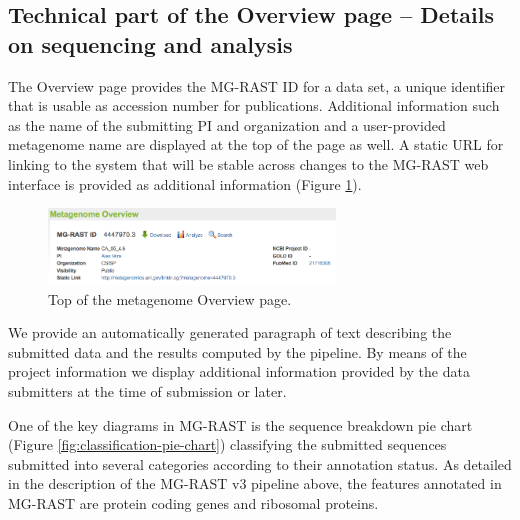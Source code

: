 \documentclass[12pt,fullpage]{report}
\begin{document}

\subsection{Technical part of the Overview page -- Details on sequencing and analysis}

The Overview page provides the MG-RAST ID for a data set, a unique identifier that is usable as accession number for publications. Additional information such as the name of the submitting PI and organization and a user-provided metagenome name are displayed at the top of the page as well. A static URL for linking to the system that will be stable across changes to the MG-RAST web interface is provided as additional information
(Figure \ref{fig:metagenome-overview}).

\begin{figure}
\begin{center}
\includegraphics[width=3in]{Images/metagenome-overview.png}
\end{center}
\caption{
Top of the metagenome Overview page.
}
\label{fig:metagenome-overview}
\end{figure}

We provide an automatically generated paragraph of text describing the submitted data and the results computed by the pipeline. By means of the project information we display additional information provided by the data submitters at the time of submission or later.

One of the key diagrams in MG-RAST is the sequence breakdown pie chart (Figure \ref{fig:classification-pie-chart}) classifying the submitted sequences submitted into several categories according to their annotation status. As detailed in the description of the MG-RAST v3 pipeline above, the features annotated in MG-RAST are protein coding genes and ribosomal proteins.
\end{document}
